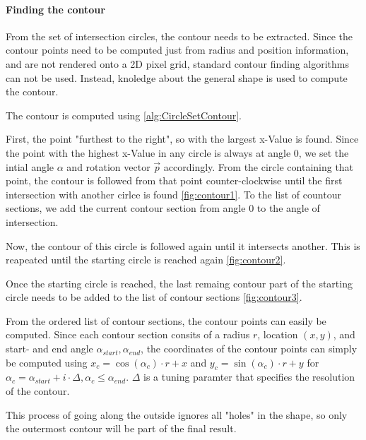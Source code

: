 \paragraph{Finding the contour}

From the set of intersection circles, the contour needs to be extracted. 
Since the contour points need to be computed just from radius and position information, and are not rendered onto a 2D pixel grid, standard contour finding algorithms can not be used.
Instead, knoledge about the general shape is used to compute the contour. 

The contour is computed using \autoref{alg:CircleSetContour}.

First, the point "furthest to the right", so with the largest x-Value is found. 
Since the point with the highest x-Value in any circle is always at angle 0, we set the intial angle $\alpha$ and rotation vector $\vec{p}$ accordingly.
From the circle containing that point, the contour is followed from that point counter-clockwise until the first intersection with another cirlce is found \autoref{fig:contour1}.
To the list of countour sections, we add the current contour section from angle 0 to the angle of intersection.

Now, the contour of this circle is followed again until it intersects another. This is reapeated until the starting circle is reached again \autoref{fig:contour2}.

Once the starting circle is reached, the last remaing contour part of the starting circle needs to be added to the list of contour sections \autoref{fig:contour3}.

From the ordered list of contour sections, the contour points can easily be computed.
Since each contour section consits of a radius $r$, location $(x,y)$, and start- and end angle $\alpha_{start}, \alpha_{end}$, the coordinates of the contour points can simply be computed using $x_c = \cos(\alpha_c) \cdot r + x$ and  $y_c = \sin(\alpha_c) \cdot r + y$ 
for $\alpha_c = \alpha_{start} + i \cdot \Delta, \alpha_c \leq \alpha_{end}$.
$\Delta$ is a tuning paramter that specifies the resolution of the contour.

This process of going along the outside ignores all "holes" in the shape, so only the outermost contour will be part of the final result. 

